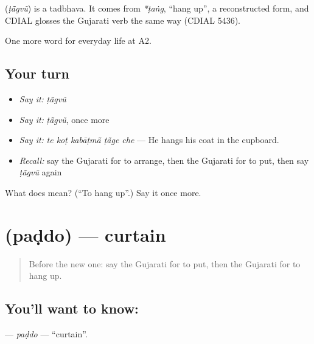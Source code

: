\begin{cousinweb}
\textbf{} (\emph{ṭā̃gvũ}) is a tadbhava. It comes from \emph{*ṭaṅg}, \textquotedblleft{}hang up\textquotedblright{}, a reconstructed form, and CDIAL glosses the Gujarati verb the same way (CDIAL 5436).
\end{cousinweb}

\begin{grammarlens}[title={What you've built}]
One more word for everyday life at A2.
\end{grammarlens}

\subsection*{Your turn}
\begin{itemize}
\raggedright
  \item \emph{Say it:} \emph{ṭā̃gvũ}
  \item \emph{Say it:} \emph{ṭā̃gvũ}, once more
  \item \emph{Say it:} \emph{te koṭ kabāṭmā̃ ṭā̃ge che} — He hangs his coat in the cupboard.
  \item \emph{Recall:} say the Gujarati for to arrange, then the Gujarati for to put, then say \emph{ṭā̃gvũ} again
\end{itemize}

\begin{tcolorbox}[breakable,colback=teal!4,colframe=teal!35!black,title={Before you move on}]
What does  mean? (\textquotedblleft{}To hang up\textquotedblright{}.) Say it once more.
\end{tcolorbox}
\section[\texorpdfstring{\gu{પડદો} (paḍdo)}{પડદો (paḍdo)}]{ (paḍdo) — curtain}

\label{lesson:GU-C157-paddo}



\begin{quote}
Before the new one: say the Gujarati for to put, then the Gujarati for to hang up.
\end{quote}

\subsection*{You'll want to know: }
\textbf{} — \emph{paḍdo} — \textquotedblleft{}curtain\textquotedblright{}.

